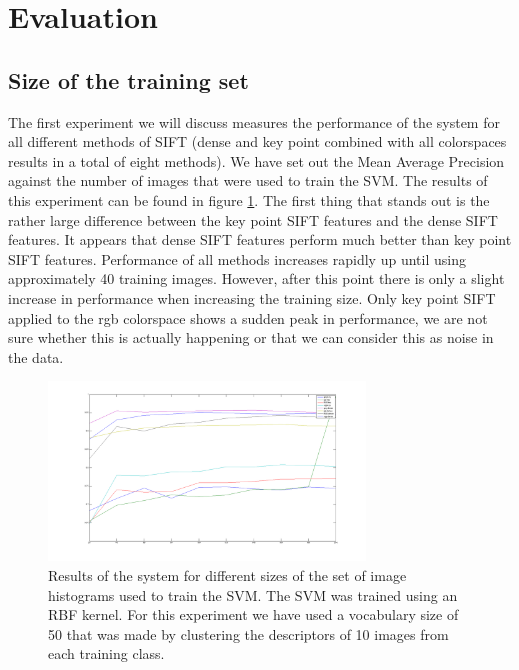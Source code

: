 \documentclass[11pt]{article}
\begin{document}
\section{Evaluation}

\subsection{Size of the training set}
\label{train}
The first experiment we will discuss measures the performance of the system for all different methods of SIFT (dense and key point combined with all colorspaces results in a total of eight methods). We have set out the Mean Average Precision against the number of images that were used to train the SVM. The results of this experiment can be found in figure \ref{trainingSizes}. The first thing that stands out is the rather large difference between the key point SIFT features and the dense SIFT features. It appears that dense SIFT features perform much better than key point SIFT features. Performance of all methods increases rapidly up until using approximately 40 training images. However, after this point there is only a slight increase in performance when increasing the training size. Only key point SIFT applied to the rgb colorspace shows a sudden peak in performance, we are not sure whether this is actually happening or that we can consider this as noise in the data. 
\begin{figure}[H]
  \centering
    \includegraphics[width=0.75\textwidth]{trainingSizes}
      \caption{Results of the system for different sizes of the set of image histograms used to train the SVM. The SVM was trained using an RBF kernel. For this experiment we have used a vocabulary size of 50 that was made by clustering the descriptors of 10 images from each training class.}
      \label{trainingSizes}
\end{figure}
\end{document}
